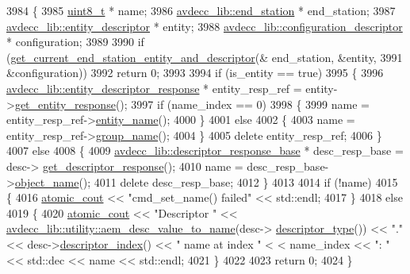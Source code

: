 \begin{DoxyCode}
3984 \{
3985     \hyperlink{stdint_8h_aba7bc1797add20fe3efdf37ced1182c5}{uint8\_t} * name;
3986     \hyperlink{classavdecc__lib_1_1end__station}{avdecc\_lib::end\_station} * end\_station;
3987     \hyperlink{classavdecc__lib_1_1entity__descriptor}{avdecc\_lib::entity\_descriptor} * entity;
3988     \hyperlink{classavdecc__lib_1_1configuration__descriptor}{avdecc\_lib::configuration\_descriptor} * configuration;
3989 
3990     \textcolor{keywordflow}{if} (\hyperlink{classcmd__line_ac2d4611fba7db03d436a2e3c1e64828e}{get\_current\_end\_station\_entity\_and\_descriptor}(&
      end\_station, &entity,
3991                                                       &configuration))
3992         \textcolor{keywordflow}{return} 0;
3993 
3994     \textcolor{keywordflow}{if} (is\_entity == \textcolor{keyword}{true})
3995     \{
3996         \hyperlink{classavdecc__lib_1_1entity__descriptor__response}{avdecc\_lib::entity\_descriptor\_response} * entity\_resp\_ref = 
      entity->\hyperlink{classavdecc__lib_1_1entity__descriptor_ac31dd117f0c931ae93c8ba52df7211bd}{get\_entity\_response}();
3997         \textcolor{keywordflow}{if} (name\_index == 0)
3998         \{
3999             name = entity\_resp\_ref->\hyperlink{classavdecc__lib_1_1entity__descriptor__response_a3abd11ceacbf37b685377f2b73a502ca}{entity\_name}();
4000         \}
4001         \textcolor{keywordflow}{else}
4002         \{
4003             name = entity\_resp\_ref->\hyperlink{classavdecc__lib_1_1entity__descriptor__response_a207bace822bc8f687c54d2f6ba61c252}{group\_name}();
4004         \}
4005         \textcolor{keyword}{delete} entity\_resp\_ref;
4006     \}
4007     \textcolor{keywordflow}{else}
4008     \{
4009         \hyperlink{classavdecc__lib_1_1descriptor__response__base}{avdecc\_lib::descriptor\_response\_base} * desc\_resp\_base = desc->
      \hyperlink{classavdecc__lib_1_1descriptor__base_ac64e6a5ee8781eeb9c781953e845b1be}{get\_descriptor\_response}();
4010         name = desc\_resp\_base->\hyperlink{classavdecc__lib_1_1descriptor__response__base_a133f7774946d80f82b8aaaa4cfbb7361}{object\_name}();
4011         \textcolor{keyword}{delete} desc\_resp\_base;
4012     \}
4013 
4014     \textcolor{keywordflow}{if} (!name)
4015     \{
4016         \hyperlink{cmd__line_8h_a0bc38ccc65c79ba06c6fcd7b4bf554c3}{atomic\_cout} << \textcolor{stringliteral}{"cmd\_set\_name() failed"} << std::endl;
4017     \}
4018     \textcolor{keywordflow}{else}
4019     \{
4020         \hyperlink{cmd__line_8h_a0bc38ccc65c79ba06c6fcd7b4bf554c3}{atomic\_cout} << \textcolor{stringliteral}{"Descriptor "} << 
      \hyperlink{namespaceavdecc__lib_1_1utility_a6bdd02679e5a911a071d4aa03be341f0}{avdecc\_lib::utility::aem\_desc\_value\_to\_name}(desc->
      \hyperlink{classavdecc__lib_1_1descriptor__base_a5112b70022171063ec5d3242bee9910e}{descriptor\_type}()) << \textcolor{stringliteral}{"."} << desc->\hyperlink{classavdecc__lib_1_1descriptor__base_a7eed5583bffdf72d89021b188648c1b5}{descriptor\_index}() << \textcolor{stringliteral}{" name at index "} <
      < name\_index << \textcolor{stringliteral}{": "} << std::dec << name << std::endl;
4021     \}
4022 
4023     \textcolor{keywordflow}{return} 0;
4024 \}
\end{DoxyCode}


